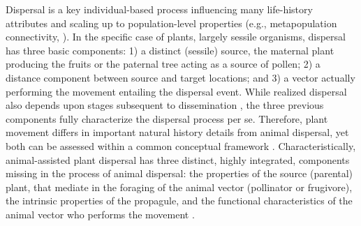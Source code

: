 \documentclass[a4paper, 12pt]{article}
\begin{document}
\begin{linenumbers}
Dispersal is a key individual-based process influencing many life-history attributes and scaling up to population-level properties (e.g., metapopulation connectivity, \citealt{Cousens:2008aa}). In the specific case of plants, largely sessile organisms, dispersal has three basic components: 1) a distinct (sessile) source, the maternal plant producing the fruits or the paternal tree acting as a source of pollen; 2) a distance component between source and target locations; and 3) a vector actually performing the movement entailing the dispersal event. While realized dispersal also depends upon stages subsequent to dissemination \citep[e.g., successful germination and seedling establishment;][]{Schupp:1995}, the three previous components fully characterize the dispersal process per se. Therefore, plant movement differs in important natural history details from animal dispersal, yet both can be assessed within a common conceptual framework \citep[e.g., ][]{Nathan:2006aa}. Characteristically, animal-assisted plant dispersal has three distinct, highly integrated, components missing in the process of animal dispersal: the properties of the source (parental) plant, that mediate in the foraging of the animal vector (pollinator or frugivore), the intrinsic properties of the propagule, and the functional characteristics of the animal vector who performs the movement \citep{Nathan:2008fx}.    


\end{linenumbers}
\end{document}
